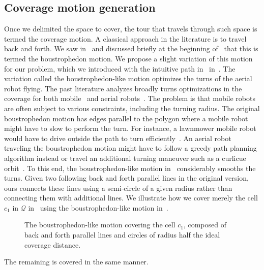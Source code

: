 
\subsection{Coverage motion generation}
\label{sec:cov-motion}

Once we delimited the space to cover, the tour that travels through such space is termed the coverage motion. A classical approach in the literature is to travel back and forth. We saw in~ and discussed briefly at the beginning of~ that this is termed the boustrophedon motion. We propose a slight variation of this motion for our problem, which we introduced with the intuitive path in~ in~. The variation called the boustrophedon-like motion optimizes the turns of the aerial robot flying. The past literature analyzes broadly turns optimizations in the coverage for both mobile~\citep{huang2001optimal} and aerial robots~\citep{artemenko2016energy,li2011coverage}. The problem is that mobile robots are often subject to various constraints, including the turning radius. The original boustrophedon motion has edges parallel to the polygon where a mobile robot might have to slow to perform the turn. For instance, a lawnmower mobile robot would have to drive outside the path to turn efficiently~\citep{huang2001optimal}. An aerial robot traveling the boustrophedon motion might have to follow a greedy path planning algorithm instead or travel an additional turning maneuver such as a curlicue orbit~\citep{xu2011optimal,xu2014efficient}. To this end, the boustrophedon-like motion in~ considerably smooths the turns. Given two following back and forth parallel lines in the original version, ours connects these lines using a semi-circle of a given radius rather than connecting them with additional lines. We illustrate how we cover merely the cell $c_1$ in $\mathcal{Q}$ in~ using the boustrophedon-like motion in~. 
\begin{figure}[h]
  \centering
  \selectfont
  
  \caption[Boustrophedon-like motion covering a cell]{The boustrophedon-like motion covering the cell $c_1$, composed of back and forth parallel lines and circles of radius half the ideal coverage distance.}
  \label{fig:bm}
\end{figure}
The remaining is covered in the same manner.

